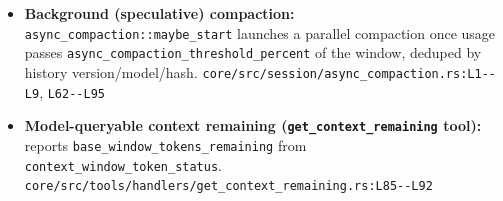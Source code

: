 \begin{itemize}
\item \textbf{Background (speculative) compaction:} \texttt{async\_\allowbreak{}compaction:\allowbreak{}:\allowbreak{}maybe\_\allowbreak{}start} launches a parallel compaction once usage passes \texttt{async\_\allowbreak{}compaction\_\allowbreak{}threshold\_\allowbreak{}percent} of the window, deduped by history version/model/hash. \texttt{core/\allowbreak{}src/\allowbreak{}session/\allowbreak{}async\_\allowbreak{}compaction.\allowbreak{}rs:\allowbreak{}L1-\allowbreak{}-\allowbreak{}L9}, \texttt{L62-\allowbreak{}-\allowbreak{}L95}
\item \textbf{Model-queryable context remaining (\texttt{get\_\allowbreak{}context\_\allowbreak{}remaining} tool):} reports \texttt{base\_\allowbreak{}window\_\allowbreak{}tokens\_\allowbreak{}remaining} from \texttt{context\_\allowbreak{}window\_\allowbreak{}token\_\allowbreak{}status}. \texttt{core/\allowbreak{}src/\allowbreak{}tools/\allowbreak{}handlers/\allowbreak{}get\_\allowbreak{}context\_\allowbreak{}remaining.\allowbreak{}rs:\allowbreak{}L85-\allowbreak{}-\allowbreak{}L92}
\end{itemize}

